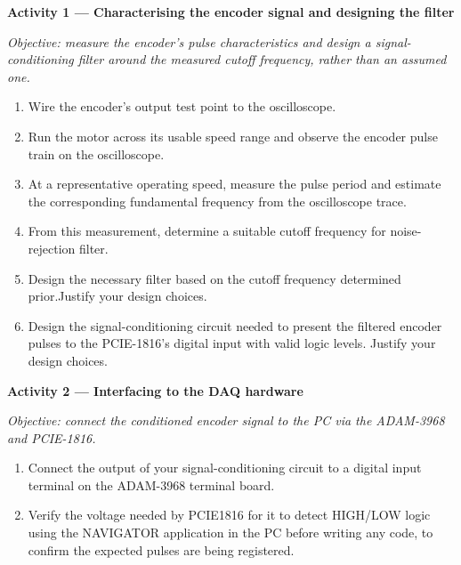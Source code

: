 \begin{procedure}

  \textbf{Activity 1 --- Characterising the encoder signal and designing the filter}\vspace{2pt}

  \textit{Objective: measure the encoder's pulse characteristics and design a signal-conditioning filter around the measured cutoff frequency, rather than an assumed one.}

  \begin{enumerate}
    \item Wire the encoder's output test point to the oscilloscope.
    \item Run the motor across its usable speed range and observe the encoder pulse train on the oscilloscope.
    \item At a representative operating speed, measure the pulse period and estimate the corresponding fundamental frequency from the oscilloscope trace.
    \item From this measurement, determine a suitable cutoff frequency for noise-rejection filter.\newpage
    \item Design the necessary filter based on the cutoff frequency determined prior.Justify your design choices.
    \item Design the signal-conditioning circuit needed to present the filtered encoder pulses to the PCIE-1816's digital input with valid logic levels. Justify your design choices.
  \end{enumerate}
  \vspace*{1.5em}

  \textbf{Activity 2 --- Interfacing to the DAQ hardware}\vspace{2pt}

  \textit{Objective: connect the conditioned encoder signal to the PC via the ADAM-3968 and PCIE-1816.}

  \begin{enumerate}
    \item Connect the output of your signal-conditioning circuit to a digital input terminal on the ADAM-3968 terminal board.
    \item Verify the voltage needed by PCIE1816 for it to detect HIGH/LOW logic using the NAVIGATOR application in the PC before writing any code, to confirm the expected pulses are being registered.
  \end{enumerate}


\end{procedure}

